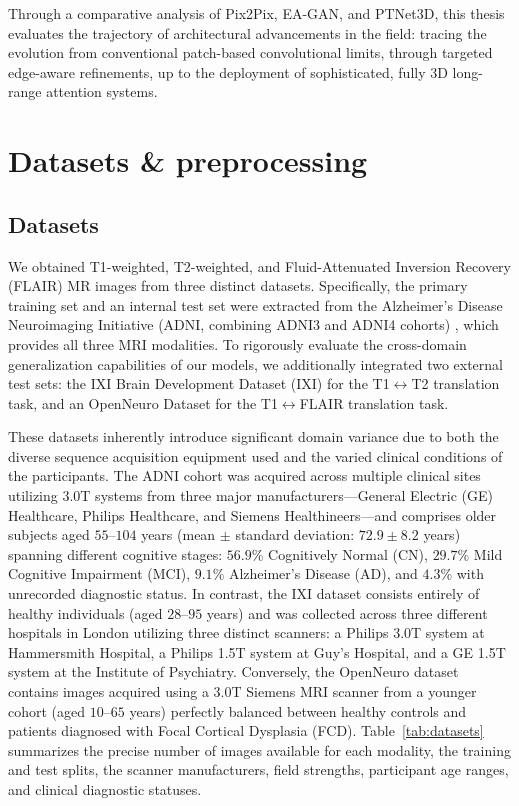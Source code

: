 \documentclass[11pt,a4paper]{article}
\begin{document}
Through a comparative analysis of Pix2Pix, EA-GAN, and PTNet3D, this thesis evaluates the trajectory of architectural advancements in the field: tracing the evolution from conventional patch-based convolutional limits, through targeted edge-aware refinements, up to the deployment of sophisticated, fully 3D long-range attention systems.

\section{Datasets \& preprocessing}
\label{sec: 3}

\subsection{Datasets}
\label{subsec:datasets}
We obtained T1-weighted, T2-weighted, and Fluid-Attenuated Inversion Recovery (FLAIR) MR images from three distinct datasets. Specifically, the primary training set and an internal test set were extracted from the Alzheimer's Disease Neuroimaging Initiative (ADNI, combining ADNI3 and ADNI4 cohorts) \cite{jack2008alzheimer}, which provides all three MRI modalities. To rigorously evaluate the cross-domain generalization capabilities of our models, we additionally integrated two external test sets: the IXI Brain Development Dataset (IXI) \cite{ixidata} for the T1$\leftrightarrow$T2 translation task, and an OpenNeuro Dataset \cite{ds004199:1.0.0} for the T1$\leftrightarrow$FLAIR translation task.

These datasets inherently introduce significant domain variance due to both the diverse sequence acquisition equipment used and the varied clinical conditions of the participants. The ADNI cohort was acquired across multiple clinical sites utilizing 3.0T systems from three major manufacturers---General Electric (GE) Healthcare, Philips Healthcare, and Siemens Healthineers---and comprises older subjects aged $55$--$104$ years (mean $\pm$ standard deviation: $72.9 \pm 8.2$ years) spanning different cognitive stages: $56.9\%$ Cognitively Normal (CN), $29.7\%$ Mild Cognitive Impairment (MCI), $9.1\%$ Alzheimer's Disease (AD), and $4.3\%$ with unrecorded diagnostic status. In contrast, the IXI dataset consists entirely of healthy individuals (aged $28$--$95$ years) and was collected across three different hospitals in London utilizing three distinct scanners: a Philips 3.0T system at Hammersmith Hospital, a Philips 1.5T system at Guy's Hospital, and a GE 1.5T system at the Institute of Psychiatry. Conversely, the OpenNeuro dataset contains images acquired using a 3.0T Siemens MRI scanner from a younger cohort (aged $10$--$65$ years) perfectly balanced between healthy controls and patients diagnosed with Focal Cortical Dysplasia (FCD). Table~\ref{tab:datasets} summarizes the precise number of images available for each modality, the training and test splits, the scanner manufacturers, field strengths, participant age ranges, and clinical diagnostic statuses.
\end{document}

